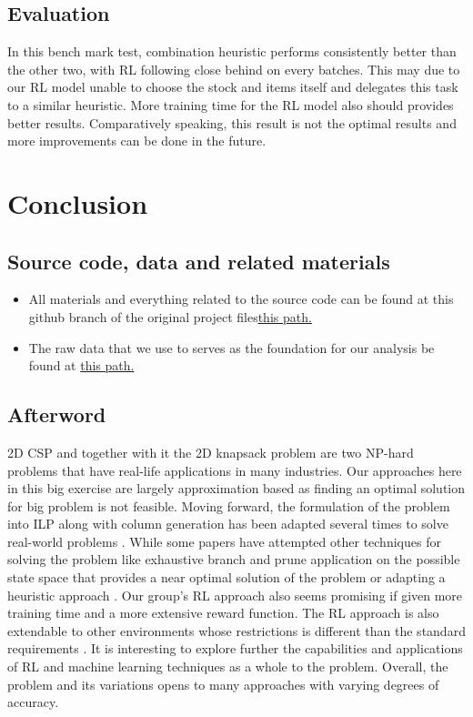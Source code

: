\documentclass[a4paper]{article}
\begin{document}
    \subsection{Evaluation}
    In this bench mark test, combination heuristic performs consistently better than the other two, with RL following close behind on every batches. This may due to our RL model unable to choose the stock and items itself and delegates this task to a similar heuristic. More training time for the RL model also should provides better results. Comparatively speaking, this result is not the optimal results and more improvements can be done in the future. 
    
    \pagebreak
    \section{Conclusion}
    \subsection{Source code, data and related materials}
    \begin{itemize}
        \item All materials and everything related to the source code can be found at this github branch of the original project files\href{https://github.com/NgocMinhUniversityProjects/MM241-Assignment}{this path.}
        \item The raw data that we use to serves as the foundation for our analysis be found at \href{https://drive.google.com/drive/folders/1OHjhVcdQswM6GQm5XlXxvGm6hEE0m3ZU?usp=sharing}{this path.}
    \end{itemize}
    \subsection{Afterword}
    2D CSP and together with it the 2D knapsack problem are two NP-hard problems that have real-life applications in many industries. Our approaches here in this big exercise are largely approximation based as finding an optimal solution for big problem is not feasible. Moving forward, the formulation of the problem into ILP along with column generation has been adapted several times to solve real-world problems \cite{columnGenCintra} \cite{columnGenRosaFurini}. While some papers have attempted other techniques for solving the problem like exhaustive branch and prune application on the possible state space that provides a near optimal solution of the problem\cite{IORI2021399} or adapting a heuristic approach \cite{https://doi.org/10.1155/2021/3732720}. Our group's RL approach also seems promising if given more training time and a more extensive reward function. The RL approach is also extendable to other environments whose restrictions is different than the standard requirements \cite{limitedopenstack}. It is interesting to explore further the capabilities and applications of RL and machine learning techniques as a whole to the problem. Overall, the problem and its variations opens to many approaches with varying degrees of accuracy.
    
    \pagebreak
    \nocite{*}
    \printbibliography[
        heading=bibintoc,
        title={References},
    ]
\end{document}
